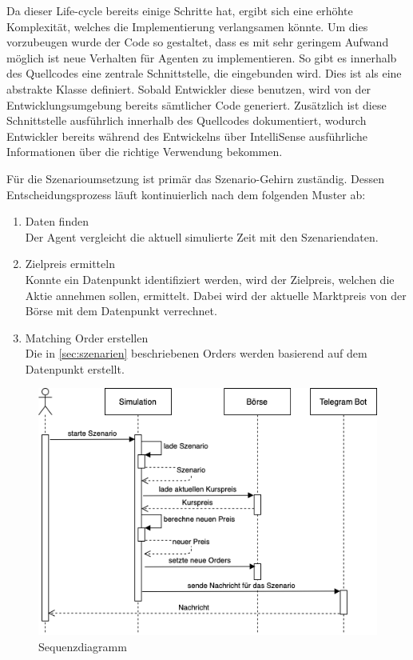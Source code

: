 Da dieser Life-cycle bereits einige Schritte hat, ergibt sich eine erhöhte Komplexität, welches die Implementierung verlangsamen könnte.
Um dies vorzubeugen wurde der Code so gestaltet, dass es mit sehr geringem Aufwand möglich ist neue Verhalten für Agenten zu implementieren. So gibt es innerhalb des Quellcodes eine zentrale Schnittstelle, die eingebunden wird. Dies ist als eine abstrakte Klasse definiert. Sobald Entwickler diese benutzen, wird von der Entwicklungsumgebung bereits sämtlicher Code generiert. Zusätzlich ist diese Schnittstelle ausführlich innerhalb des Quellcodes dokumentiert, wodurch Entwickler bereits während des Entwickelns über IntelliSense ausführliche Informationen über die richtige Verwendung bekommen.


Für die Szenarioumsetzung ist primär das Szenario-Gehirn zuständig. Dessen Entscheidungsprozess läuft kontinuierlich nach dem folgenden Muster ab:
\begin{enumerate}
    \item Daten finden\\
        Der Agent vergleicht die aktuell simulierte Zeit mit den Szenariendaten.
    \item Zielpreis ermitteln\\
        Konnte ein Datenpunkt identifiziert werden, wird der Zielpreis, welchen die Aktie annehmen sollen, ermittelt. Dabei wird der aktuelle Marktpreis von der Börse mit dem Datenpunkt verrechnet.
    \item Matching Order erstellen\\
        Die in \autoref{sec:szenarien} beschriebenen Orders werden basierend auf dem Datenpunkt erstellt.
\end{enumerate}

\begin{figure}[ht]
    \includegraphics[width=\textwidth]{img/Sequenzdiagramm.png}
    \centering
    \caption{Sequenzdiagramm}
    \label{fig:Sequenzdiagramm}
\end{figure}
